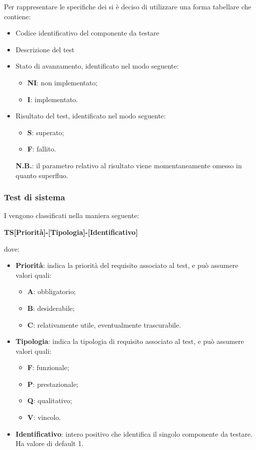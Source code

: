 		Per rappresentare le specifiche dei  si è deciso di utilizzare una forma tabellare che contiene:
		\begin{itemize}
			\item Codice identificativo del componente da testare
			\item Descrizione del test
			\item Stato di avanzamento, identificato nel modo seguente:
				\begin{itemize}
					\item \textbf{NI}: non implementato;
					\item \textbf{I}: implementato.						
				\end{itemize}		
			\item Risultato del test, identificato nel modo seguente:
				\begin{itemize}
					\item \textbf{S}: superato;
					\item \textbf{F}: fallito.
				\end{itemize}
				\textbf{N.B.}: il parametro relativo al risultato viene momentaneamente omesso in quanto superfluo.						 
		\end{itemize}				
		
		\subsubsection{Test di sistema}
		I  vengono classificati nella maniera seguente:
		\begin{center}
			\textbf{TS[Priorità]-[Tipologia]-[Identificativo]}
		\end{center}		 
		dove:\\
		\begin{itemize}
			\item \textbf{Priorità}: indica la priorità del requisito associato al test, e può assumere valori quali:
			\begin{itemize}
				\item \textbf{A}: obbligatorio;
				\item \textbf{B}: desiderabile;
				\item \textbf{C}: relativamente utile, eventualmente trascurabile.
			\end{itemize}
			\item \textbf{Tipologia}: indica la tipologia di requisito associato al test, e può assumere valori quali:
			\begin{itemize}
				\item \textbf{F}: funzionale;
				\item \textbf{P}: prestazionale;
				\item \textbf{Q}: qualitativo;
				\item \textbf{V}: vincolo.
			\end{itemize}
			\item \textbf{Identificativo}: intero positivo che identifica il singolo componente da testare. Ha valore di default 1.
		\end{itemize}
		 

